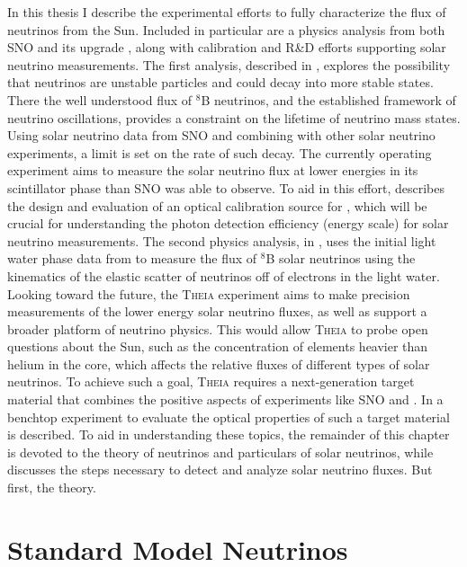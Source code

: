 In this thesis I describe the experimental efforts to fully characterize the flux of neutrinos from the Sun.
Included in particular are a physics analysis from both SNO and its upgrade {\snop}, along with calibration and R\&D efforts supporting solar neutrino measurements.
The first analysis, described in , explores the possibility that neutrinos are unstable particles and could decay into more stable states.
There the well understood flux of $^8$B neutrinos, and the established framework of neutrino oscillations, provides a constraint on the lifetime of neutrino mass states.
Using solar neutrino data from SNO and combining with other solar neutrino experiments, a limit is set on the rate of such decay.
The currently operating {\snop} experiment aims to measure the solar neutrino flux at lower energies in its scintillator phase than SNO was able to observe.
To aid in this effort,  describes the design and evaluation of an optical calibration source for {\snop}, which will be crucial for understanding the photon detection efficiency (energy scale) for solar neutrino measurements.
The second physics analysis, in , uses the initial light water phase data from {\snop} to measure the flux of $^8$B solar neutrinos using the kinematics of the elastic scatter of neutrinos off of electrons in the light water.
Looking toward the future, the \textsc{Theia} \cite{asdc} experiment aims to make precision measurements of the lower energy solar neutrino fluxes, as well as support a broader platform of neutrino physics.
This would allow \textsc{Theia} to probe open questions about the Sun, such as the concentration of elements heavier than helium in the core, which affects the relative fluxes of different types of solar neutrinos. 
To achieve such a goal, \textsc{Theia} requires a next-generation target material that combines the positive aspects of experiments like SNO and {\snop}. 
In  a benchtop experiment to evaluate the optical properties of such a target material is described.
To aid in understanding these topics, the remainder of this chapter is devoted to the theory of neutrinos and particulars of solar neutrinos, while  discusses the steps necessary to detect and analyze solar neutrino fluxes.
But first, the theory.

\section{Standard Model Neutrinos}
\label{sec:stdmodel}

